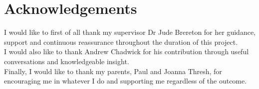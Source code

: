 \documentclass[../../main.tex]{subfiles}
\begin{document}
\clearpage
\thispagestyle{empty}

	\section*{Acknowledgements}


\vspace{5cm}
	\begin{center}
	\begin{minipage}{0.7\textwidth}
	\centering
	I would like to first of all thank my supervisor Dr Jude Brereton for her guidance, support and continuous reassurance throughout the duration of this project.\\
	\vspace{5mm}
	I would also like to thank Andrew Chadwick for his contribution through useful conversations and knowledgeable insight.\\
	\vspace{5mm}
	Finally, I would like to thank my parents, Paul and Joanna Thresh, for encouraging me in whatever I do and supporting me regardless of the outcome.
	
	\end{minipage}
	\end{center}
\end{document}
